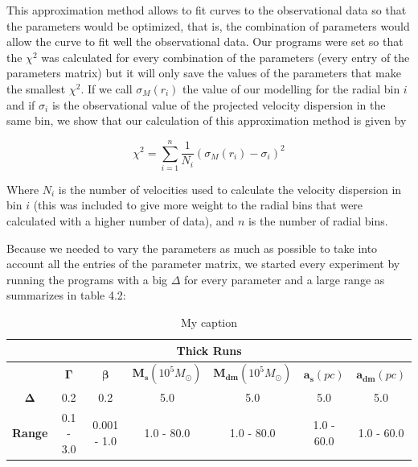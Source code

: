 This approximation method allows to fit curves to the observational data so that the parameters would be optimized, that is, the combination of parameters would allow the curve to fit well the observational data. Our programs were set so that the $\chi^{2}$ was calculated for every combination of the parameters (every entry of the parameters matrix) but it will only save the values of the parameters that make the smallest $\chi^{2}$. If we call $\sigma_{M}(r_{i})$ the value of our modelling for the radial bin $i$ and if $\sigma_{i}$ is the observational value of the projected velocity dispersion in the same bin, we show that our calculation of this approximation method is given by 

\begin{equation}
\chi^{2}=\sum_{i=1}^{n}\frac{1}{N_{i}}{\left(\sigma_{M}\left(r_{i}\right)-\sigma_{i}\right)}^{2}
\end{equation}

Where $N_{i}$ is the number of velocities used to calculate the velocity dispersion in bin $i$ (this was included to give more weight to the radial bins that were calculated with a higher number of data), and $n$ is the number of radial bins.

Because we needed to vary the parameters as much as possible to take into account all the entries of the parameter matrix, we started every experiment by running the programs with a big $\Delta$ for every parameter and a large range as summarizes in table 4.2:

\begin{table}[H]
\centering
\label{my-label}
\begin{tabular}{|c|c|c|c|c|c|c|}
\hline
\multicolumn{7}{|c|}{\textbf{Thick Runs}}                                                                          \\ \hline
               & \textbf{$\mathbf{\Gamma}$} & \textbf{$\mathbf{\beta}$} & \textbf{$\mathbf{M_{s}}(10^{5} M_{\odot})$} & \textbf{$\mathbf{M_{dm}}(10^{5} M_{\odot})$} & \textbf{$\mathbf{a_{s}}(pc)$} & \textbf{$\mathbf{a_{dm}}(pc)$} \\ \hline
\textbf{$\mathbf{\Delta}$}  & 0.2  & 0.2      & 5.0     & 5.0     & 5.0      & 5.0            \\ \hline
\textbf{Range} & 0.1 - 3.0      & 0.001 - 1.0        & 1.0 - 80.0      & 1.0 - 80.0   & 1.0 - 60.0      & 1.0 - 60.0            \\ \hline
\end{tabular}
\caption{My caption}
\end{table}

